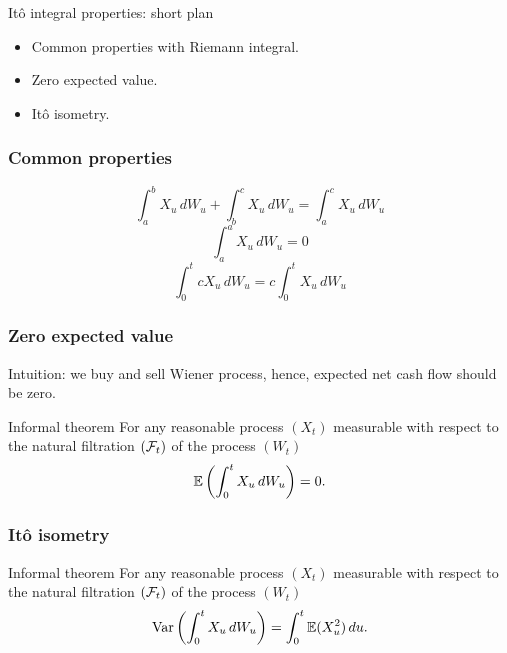 


\begin{frame} %

    
    \end{frame}
    
    
    \begin{frame}{Itô integral properties: short plan}
    
      \begin{itemize}[<+->]
        \item \alert{Common properties} with Riemann integral.
        \item \alert{Zero expected value}.
        \item \alert{Itô isometry}.
      \end{itemize}
    
    \end{frame}


\begin{frame}
        \frametitle{Common properties}

        \[
        \int_a^b X_u \, dW_u  + \int_b^c X_u \, dW_u =  \int_a^c X_u \, dW_u    
        \]
        \pause 
        \[
        \int_a^a X_u \, dW_u = 0    
        \]
        \pause
        \[
        \int_0^t c X_u \, dW_u = c\int_0^t X_u \, dW_u    
        \]
    
\end{frame}


\begin{frame}
    \frametitle{Zero expected value}

    Intuition: we buy and sell Wiener process, hence, expected net cash flow should be zero.

    \pause
\begin{block}{Informal theorem\informalduck}
For any reasonable process $(X_t)$ measurable with respect to the natural filtration $(\mathcal{F}_t)$ of the process $(W_t)$
\[
\mathbb{E}\left(\int_0^t X_u \, dW_u \right)  = 0.   
\]
\end{block}

\end{frame}

    
\begin{frame}
    \frametitle{Itô isometry}

\begin{block}{Informal theorem\informalduck}
        For any reasonable process $(X_t)$ measurable with respect to the natural filtration $(\mathcal{F}_t)$ of the process $(W_t)$
        \[
        \operatorname{Var}\left(\int_0^t X_u \, dW_u \right)  = \int_0^t \mathbb{E}(X_u^2) \, du.   
        \]
\end{block}
            
\end{frame}


